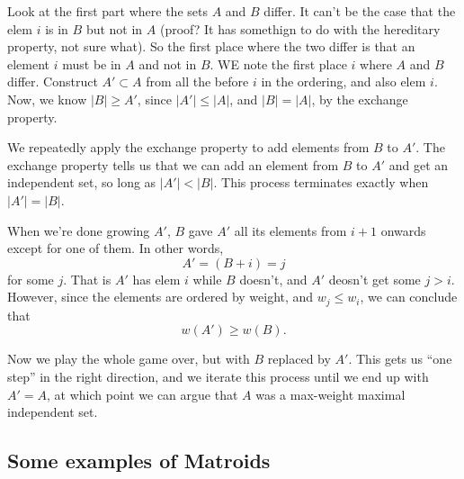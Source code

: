 \documentclass{article}
\begin{document}
Look at the first part where the sets $A$ and $B$ differ.
It can't be the case that the elem $i$ is in $B$ but not in $A$ (proof? It has
somethign to do with the hereditary property, not sure what).
So the first place where the two differ is that an element $i$ must
be in $A$ and not in $B$.
WE note the first place $i$ where $A$ and $B$ differ.
Construct $A'\subset A$ from all the before $i$ in the ordering, and also elem $i$.
Now, we know $|B| \geq A'$, since $|A'| \leq |A|$, and $|B| = |A|$, by the
exchange property.

We repeatedly apply the exchange property to add elements from $B$ to $A'$.
The exchange property tells us that we can add an element from $B$ to $A'$
and get an independent set, so long as $|A'| < |B|$.
This process terminates exactly when $|A'| = |B|$.

When we're done growing $A'$, $B$ gave $A'$ all its elements from $i+1$ onwards
except for one of them.
In other words,
$$
A' = (B + i) = j
$$
for some $j$.
That is $A'$ has elem $i$ while $B$ doesn't, and $A'$ deosn't get some
$j>i$.
However, since the elements are ordered by weight, and $w_j \leq w_i$,
we can conclude that
$$
w(A') \geq w(B).
$$

Now we play the whole game over, but with $B$ replaced by $A'$.
This gets us ``one step'' in the right direction, and we iterate
this process until we end up with $A' = A$, at which point we can
argue that $A$ was a max-weight maximal independent set.



\subsection{Some examples of Matroids}
\end{document}
